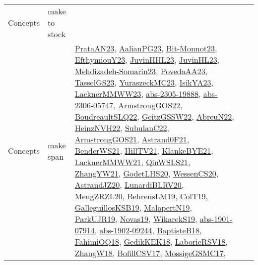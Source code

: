 {\begin{longtable}{lp{3cm}>{\raggedright}p{6cm}>{\raggedright}p{6cm}p{8cm}}
Concepts & make to stock &  &  & \\
Concepts & make span & \href{articles/PrataAN23.pdf}{PrataAN23}\cite{PrataAN23}, \href{papers/AalianPG23.pdf}{AalianPG23}\cite{AalianPG23}, \href{papers/Bit-Monnot23.pdf}{Bit-Monnot23}\cite{Bit-Monnot23}, \href{papers/EfthymiouY23.pdf}{EfthymiouY23}\cite{EfthymiouY23}, \href{papers/JuvinHHL23.pdf}{JuvinHHL23}\cite{JuvinHHL23}, \href{papers/JuvinHL23.pdf}{JuvinHL23}\cite{JuvinHL23}, \href{papers/Mehdizadeh-Somarin23.pdf}{Mehdizadeh-Somarin23}\cite{Mehdizadeh-Somarin23}, \href{papers/PovedaAA23.pdf}{PovedaAA23}\cite{PovedaAA23}, \href{papers/TasselGS23.pdf}{TasselGS23}\cite{TasselGS23}, \href{papers/YuraszeckMC23.pdf}{YuraszeckMC23}\cite{YuraszeckMC23}, \href{articles/IsikYA23.pdf}{IsikYA23}\cite{IsikYA23}, \href{articles/LacknerMMWW23.pdf}{LacknerMMWW23}\cite{LacknerMMWW23}, \href{articles/abs-2305-19888.pdf}{abs-2305-19888}\cite{abs-2305-19888}, \href{articles/abs-2306-05747.pdf}{abs-2306-05747}\cite{abs-2306-05747}, \href{papers/ArmstrongGOS22.pdf}{ArmstrongGOS22}\cite{ArmstrongGOS22}, \href{papers/BoudreaultSLQ22.pdf}{BoudreaultSLQ22}\cite{BoudreaultSLQ22}, \href{papers/GeitzGSSW22.pdf}{GeitzGSSW22}\cite{GeitzGSSW22}, \href{articles/AbreuN22.pdf}{AbreuN22}\cite{AbreuN22}, \href{articles/HeinzNVH22.pdf}{HeinzNVH22}\cite{HeinzNVH22}, \href{articles/SubulanC22.pdf}{SubulanC22}\cite{SubulanC22}, \href{papers/ArmstrongGOS21.pdf}{ArmstrongGOS21}\cite{ArmstrongGOS21}, \href{papers/Astrand0F21.pdf}{Astrand0F21}\cite{Astrand0F21}, \href{papers/BenderWS21.pdf}{BenderWS21}\cite{BenderWS21}, \href{papers/HillTV21.pdf}{HillTV21}\cite{HillTV21}, \href{papers/KlankeBYE21.pdf}{KlankeBYE21}\cite{KlankeBYE21}, \href{papers/LacknerMMWW21.pdf}{LacknerMMWW21}\cite{LacknerMMWW21}, \href{articles/QinWSLS21.pdf}{QinWSLS21}\cite{QinWSLS21}, \href{articles/ZhangYW21.pdf}{ZhangYW21}\cite{ZhangYW21}, \href{papers/GodetLHS20.pdf}{GodetLHS20}\cite{GodetLHS20}, \href{papers/WessenCS20.pdf}{WessenCS20}\cite{WessenCS20}, \href{articles/AstrandJZ20.pdf}{AstrandJZ20}\cite{AstrandJZ20}, \href{articles/LunardiBLRV20.pdf}{LunardiBLRV20}\cite{LunardiBLRV20}, \href{articles/MengZRZL20.pdf}{MengZRZL20}\cite{MengZRZL20}, \href{papers/BehrensLM19.pdf}{BehrensLM19}\cite{BehrensLM19}, \href{papers/ColT19.pdf}{ColT19}\cite{ColT19}, \href{papers/GalleguillosKSB19.pdf}{GalleguillosKSB19}\cite{GalleguillosKSB19}, \href{papers/MalapertN19.pdf}{MalapertN19}\cite{MalapertN19}, \href{papers/ParkUJR19.pdf}{ParkUJR19}\cite{ParkUJR19}, \href{articles/Novas19.pdf}{Novas19}\cite{Novas19}, \href{articles/WikarekS19.pdf}{WikarekS19}\cite{WikarekS19}, \href{articles/abs-1901-07914.pdf}{abs-1901-07914}\cite{abs-1901-07914}, \href{articles/abs-1902-09244.pdf}{abs-1902-09244}\cite{abs-1902-09244}, \href{articles/BaptisteB18.pdf}{BaptisteB18}\cite{BaptisteB18}, \href{articles/FahimiOQ18.pdf}{FahimiOQ18}\cite{FahimiOQ18}, \href{articles/GedikKEK18.pdf}{GedikKEK18}\cite{GedikKEK18}, \href{articles/LaborieRSV18.pdf}{LaborieRSV18}\cite{LaborieRSV18}, \href{articles/ZhangW18.pdf}{ZhangW18}\cite{ZhangW18}, \href{papers/BofillCSV17.pdf}{BofillCSV17}\cite{BofillCSV17}, \href{papers/MossigeGSMC17.pdf}{MossigeGSMC17}\cite{MossigeGSMC17}, 
\end{longtable}}

